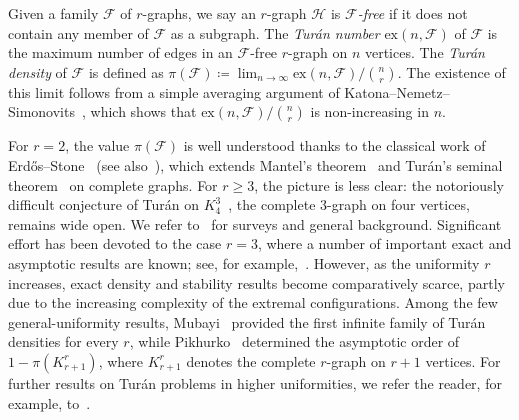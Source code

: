\documentclass[10pt,a4paper]{article}
\theoremstyle{plain}
\theoremstyle{definition}
\begin{document}
Given a family $\mathcal{F}$ of $r$-graphs, we say an $r$-graph $\mathcal{H}$ is \emph{$\mathcal{F}$-free}
if it does not contain any member of $\mathcal{F}$ as a subgraph.
The \emph{Tur\'{a}n number} $\mathrm{ex}(n, \mathcal{F})$ of $\mathcal{F}$ is the maximum number of edges in an $\mathcal{F}$-free $r$-graph on $n$ vertices. 
The \emph{Tur\'{a}n density} of $\mathcal{F}$ is defined as $\pi(\mathcal{F})\coloneqq \lim_{n\to\infty}\mathrm{ex}(n,\mathcal{F})/\binom{n}{r}$. 
The existence of this limit follows from a simple averaging argument of Katona--Nemetz--Simonovits~\cite{KNS64}, which shows that $\mathrm{ex}(n,\mathcal{F})/\binom{n}{r}$ is non-increasing in $n$.

For $r=2$, the value $\pi(\mathcal{F})$ is well understood thanks to the classical work of Erd\H{o}s--Stone~\cite{ES46} (see also~\cite{ES66}), which extends Mantel's theorem~\cite{Man07} and Tur\'{a}n's seminal theorem~\cite{Tur41} on complete graphs.
For $r \ge 3$, the picture is less clear: the notoriously difficult conjecture of Tur\'{a}n on $K_4^3$~\cite{Tur41}, the complete $3$-graph on four vertices, remains wide open.
We refer to~\cite{dC94,Fur91,Sid95,Kee11} for surveys and general background. 
Significant effort has been devoted to the case $r=3$, where a number of important exact and asymptotic results are known; see, for example,~\cite{Kee05,LZ09,Raz07,Raz10,BT11,LMP24,BLLP24}.
However, as the uniformity $r$ increases, exact density and stability results become comparatively scarce, partly due to the increasing complexity of the extremal configurations.
Among the few general-uniformity results, Mubayi~\cite{Mubayi06} provided the first infinite family of Tur\'{a}n densities for every $r$, while Pikhurko~\cite{Pik24} determined the asymptotic order of $1-\pi(K_{r+1}^r)$, where $K_{r+1}^r$ denotes the complete $r$-graph on $r+1$ vertices.
For further results on Tur\'{a}n problems in higher uniformities, we refer the reader, for example, to~\cite{dC83,FR85,Kee05,LZ09,Mar09,Sid89cont,Sid97,Pik13,MV16,LP25,CY24,Liu25,HLZZZ25}.
\end{document}
